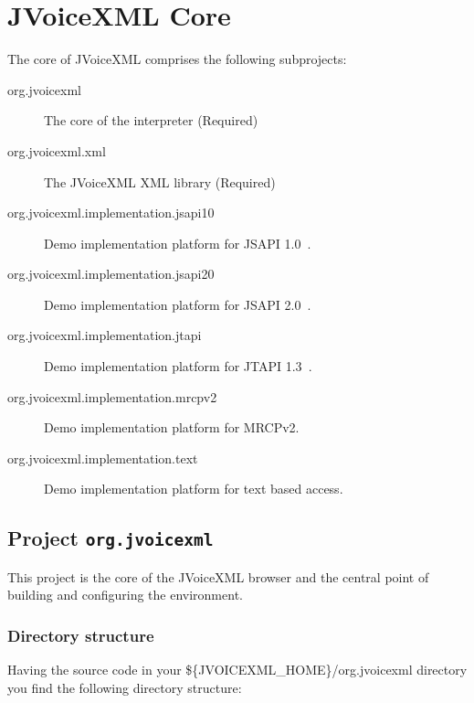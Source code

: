 \documentclass[11pt,a4paper]{article}
\begin{document}
\section{JVoiceXML Core}

The core of JVoiceXML comprises the following subprojects:

\begin{description}
\item[org.jvoicexml] The core of the interpreter (Required)
\item[org.jvoicexml.xml] The JVoiceXML XML library (Required)
\item[]\item[org.jvoicexml.implementation.jsapi10] Demo implementation platform for
JSAPI 1.0~\cite{sun:jsapi}.
\item[org.jvoicexml.implementation.jsapi20] Demo implementation platform for
JSAPI 2.0~\cite{jcp:jsr113}.
\item[org.jvoicexml.implementation.jtapi] Demo implementation platform for
JTAPI 1.3~\cite{sun:jtapi}.
\item[org.jvoicexml.implementation.mrcpv2] Demo implementation platform for
MRCPv2.
\item[org.jvoicexml.implementation.text] Demo implementation platform for
text based access.
\end{description}

\subsection{Project \lstinline{org.jvoicexml}}

This project is the core of the JVoiceXML browser and the central point of
building and configuring the environment.

\subsubsection{Directory structure}
\label{sec:directory-structure}

Having the source code in your \$\{JVOICEXML\_HOME\}/org.jvoicexml
directory you find the following directory structure:
\end{document}
